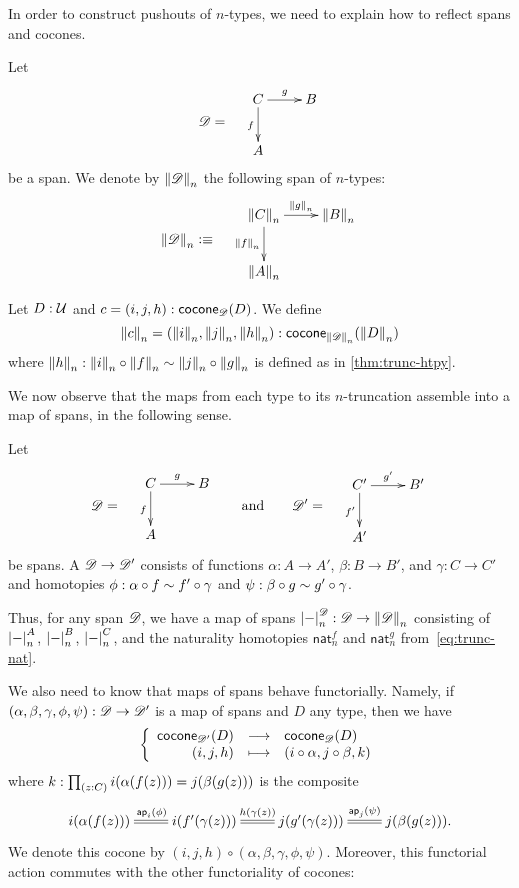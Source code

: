 In order to construct pushouts of $n$-types, we need to explain how to reflect spans and cocones.

\bgroup
\def\reflect(#1){\trunc n{#1}}

\begin{defn}
  Let
  \[\Ddiag=\quad\vcenter{\xymatrix{C \ar^g[r] \ar_f[d] & B \\ A & }}\]
  be a span. We denote by $\reflect(\Ddiag)$ the following
  span of $n$-types:
  \[\reflect(\Ddiag)\defeq\quad \vcenter{\xymatrix{\reflect(C) \ar^{\reflect(g)}[r]
      \ar_{\reflect(f)}[d] & \reflect(B) \\ \reflect(A) & }}\]
\end{defn}

\begin{defn}
  Let $D:\type$ and $c=(i,j,h):\cocone{\Ddiag}{D}$.
  We define
  \[\reflect(c)=(\reflect(i),\reflect(j),\reflect(h)):
  \cocone{\reflect(\Ddiag)}{\reflect(D)}\]
  where $\reflect(h): \reflect(i) \circ \reflect(f) \htpy \reflect(j) \circ \reflect(g)$ is defined as in \autoref{thm:trunc-htpy}.
\end{defn}

\egroup

We now observe that the maps from each type to its $n$-truncation assemble into a map of spans, in the following sense.

\begin{defn}
  Let 
  \[\Ddiag=\quad\vcenter{\xymatrix{C \ar^g[r] \ar_f[d] & B \\ A & }}
  \qquad\text{and}\qquad
  \Ddiag'=\quad\vcenter{\xymatrix{C' \ar^{g'}[r] \ar_{f'}[d] & B' \\ A' & }}
  \]
  be spans.
  A 
  $\Ddiag \to \Ddiag'$ consists of functions $\alpha:A\to A'$, $\beta:B\to B'$, and $\gamma:C\to C'$ and homotopies $\phi: \alpha\circ f \htpy f'\circ \gamma$ and $\psi:\beta\circ g \htpy g' \circ \gamma$.
\end{defn}

Thus, for any span $\Ddiag$, we have a map of spans $\tproj[\Ddiag] n- : \Ddiag \to \trunc n\Ddiag$ consisting of $\tproj[A]n-$, $\tproj[B]n-$, $\tproj[C]n-$, and the naturality homotopies $\mathsf{nat}^f_n$ and $\mathsf{nat}^g_n$ from~\eqref{eq:trunc-nat}.

We also need to know that maps of spans behave functorially.
Namely, if $(\alpha,\beta,\gamma,\phi,\psi):\Ddiag \to \Ddiag'$ is a map of spans and $D$ any type, then we have
\[ \function{\cocone{\Ddiag'}{D}}{\cocone{\Ddiag}{D}}{(i,j,h)}{(i\circ \alpha,j\circ\beta, k)} \]
where $k: \prd{z:C} i(\alpha(f(z))) = j(\beta(g(z)))$ is the composite
\begin{equation}\label{eq:mapofspans-htpy}
\xymatrix{
  i(\alpha(f(z))) \ar@{=}[r]^{\apfunc{i}(\phi)} &
  i(f'(\gamma(z))) \ar@{=}[r]^{h(\gamma(z))} &
  j(g'(\gamma(z))) \ar@{=}[r]^{\apfunc{j}(\psi)} &
  j(\beta(g(z))). }
\end{equation}
We denote this cocone by $(i,j,h) \circ (\alpha,\beta,\gamma,\phi,\psi)$.
Moreover, this functorial action commutes with the other functoriality of cocones:

